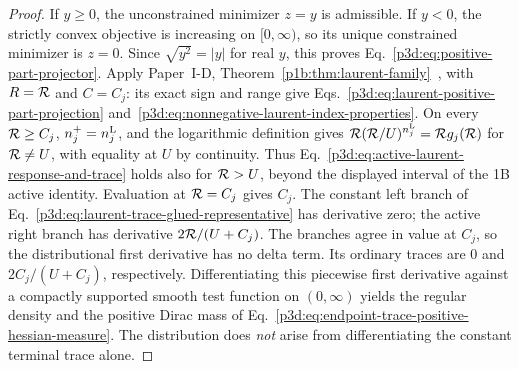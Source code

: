 \documentclass[12pt,a4paper]{article}
\begin{document}
\begin{proof}
If \(y\ge0\), the unconstrained minimizer \(z=y\) is admissible.  If
\(y<0\), the strictly convex objective is increasing on \([0,\infty)\), so
its unique constrained minimizer is \(z=0\).  Since
\(\sqrt{y^2}=\lvert y\rvert\) for real \(y\), this proves
Eq.~\eqref{p3d:eq:positive-part-projector}.  Apply Paper~I-D,
Theorem~\ref{p1b:thm:laurent-family}~\cite{Kugelmann2026Paper1D}, with
\(R=\mathcal R\) and \(C=C_j\): its exact sign and range give
Eqs.~\eqref{p3d:eq:laurent-positive-part-projection}
and~\eqref{p3d:eq:nonnegative-laurent-index-properties}.
On every \(\mathcal R\ge C_j\), \(n_j^+=n_j^{\rm L}\), and the logarithmic
definition gives \(\mathcal R(\mathcal R/U)^{n_j^{\rm L}}=\mathcal R g_j(\mathcal R)\)
for \(\mathcal R\ne U\), with equality at \(U\) by continuity.
Thus Eq.~\eqref{p3d:eq:active-laurent-response-and-trace} holds also for
\(\mathcal R>U\), beyond the displayed interval of the 1B active identity.
Evaluation at \(\mathcal R=C_j\) gives \(C_j\).  The constant left branch of
Eq.~\eqref{p3d:eq:laurent-trace-glued-representative} has derivative zero;
the active right branch has derivative \(2\mathcal R/(U+C_j)\).
The branches agree in value at \(C_j\), so the distributional first
derivative has no delta term. Its ordinary traces are \(0\) and
\(2C_j/(U+C_j)\), respectively. Differentiating this piecewise
first derivative against a compactly supported smooth test function on
\((0,\infty)\) yields the regular density and the positive Dirac
mass of Eq.~\eqref{p3d:eq:endpoint-trace-positive-hessian-measure}.
The distribution does \emph{not} arise from differentiating the constant
terminal trace alone.
\end{proof}
\end{document}

